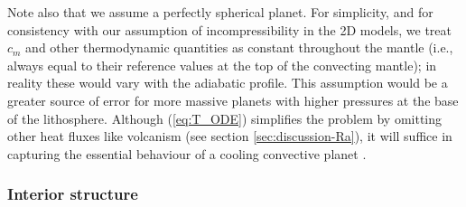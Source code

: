Note also that we assume a perfectly spherical planet. For simplicity, and for consistency with our assumption of incompressibility in the 2D models, we treat $c_m$ and other thermodynamic quantities as constant throughout the mantle (i.e., always equal to their reference values at the top of the convecting mantle); in reality these would vary with the adiabatic profile. This assumption would be a greater source of error for more massive planets with higher pressures at the base of the lithosphere. Although (\ref{eq:T_ODE}) simplifies the problem by omitting other heat fluxes like volcanism (see section \ref{sec:discussion-Ra}), it will suffice in capturing the essential behaviour of a cooling convective planet \citep{jaupart_temperatures_2015}.




\subsubsection{Interior structure}

